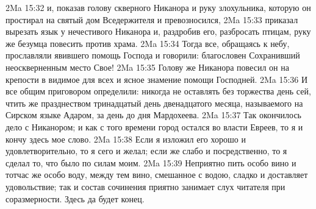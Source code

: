 \vs 2Ma 15:32 и, показав голову скверного Никанора и руку злохульника, которую он простирал на святый дом Вседержителя и превозносился,
\vs 2Ma 15:33 приказал вырезать язык у нечестивого Никанора и, раздробив его, разбросать птицам, руку же безумца повесить против храма.
\vs 2Ma 15:34 Тогда все, обращаясь к небу, прославляли явившего помощь Господа и говорили: благословен Сохранивший неоскверненным место Свое!
\vs 2Ma 15:35 Голову же Никанора повесил он на крепости в видимое для всех и ясное знамение помощи Господней.
\vs 2Ma 15:36 И все общим приговором определили: никогда не оставлять без торжества день сей, чтить же празднеством тринадцатый день двенадцатого месяца, называемого на Сирском языке Адаром, за день до дня Мардохеева.
\rsbpar\vs 2Ma 15:37 Так окончилось дело с Никанором; и как с того времени город остался во власти Евреев, то я и кончу здесь мое слово.
\vs 2Ma 15:38 Если я изложил его хорошо и удовлетворительно, то я сего и желал; если же слабо и посредственно, то я сделал то, что было по силам моим.
\vs 2Ma 15:39 Неприятно пить особо вино и тотчас же особо воду, между тем вино, смешанное с водою, сладко и доставляет удовольствие; так и состав сочинения приятно занимает слух читателя при соразмерности. Здесь да будет конец.
